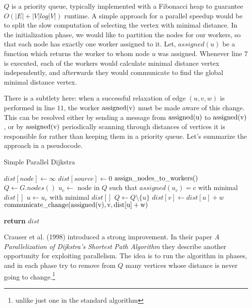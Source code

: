 \documentclass[12pt,a4paper,twoside,openright]{report}
\begin{document}
$Q$ is a priority queue, typically implemented with a Fibonacci heap to guarantee $O(|E| + |V| log |V|)$ runtime. A simple approach for a parallel speedup would be to split the slow computation of selecting the vertex with minimal distance. In the initialization phase, we would like to partition the nodes for our workers, so that each node has exactly one worker assigned to it. Let, $assigned(u)$ be a function which returns the worker to whom node $u$ was assigned. Whenever line $7$ is executed, each of the workers would calculate minimal distance vertex independently, and afterwards they would communicate to find the global minimal distance vertex.

There is a subtlety here: when a successful relaxation of edge $(u,v,w)$ is performed in line $11$, the worker $\rm{assigned(v)}$ must be made aware of this change. This can be resolved either by sending a message from $\rm{assigned(u)}$ to $\rm{assigned(v)}$, or by $\rm{assigned(v)}$ periodically scanning through distances of vertices it is responsible for rather than keeping them in a priority queue. Let's summarize the approach in a pseudocode.

\begin{algorithm}
\caption{Simple Parallel Dijkstra}\label{pdijkstra}
\begin{algorithmic}[1]
    \State $dist[node] \gets \infty$
\EndFor
\State $dist[source] \gets 0$
\State $\rm{assign\_nodes\_to\_workers()}$
\State $Q \gets G.nodes()$
        \State $u_c \gets$ node in $Q$ such that $assigned(u_c) = c$ with minimal $dist[]$
        \EndFor
        \State $u \gets u_c$ with minimal $dist[]$
        \State $Q \gets Q \setminus \{u\}$
            \State $dist[v] \gets dist[u] + w$
            \State $\rm{communicate\_change(assigned(v)}, v, dist[u] + w)$
        \EndIf
      \EndFor
    \EndWhile
    
    
\State \textbf{return} $dist$
\EndProcedure
\end{algorithmic}
\end{algorithm}

Crauser et al. (1998) \cite{dijkstra} introduced a strong improvement. In their paper \textit{A Parallelization of Dijkstra's Shortest Path Algorithm} they describe another opportunity for exploiting parallelism. The idea is to run the algorithm in phases, and in each phase try to remove from $Q$ many vertices whose distance is never going to change.\footnote{unlike just one in the standard algorithm}
\end{document}
